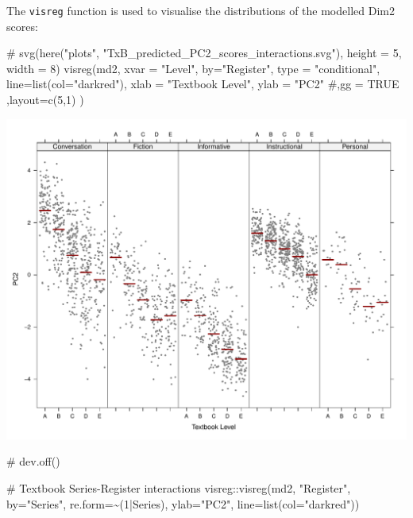 \documentclass[
  letterpaper,
  DIV=11,
  numbers=noendperiod]{scrreprt}
\newenvironment{Shaded}{\begin{snugshade}}{\end{snugshade}}
\newcommand{\AttributeTok}[1]{\textcolor[rgb]{0.40,0.45,0.13}{#1}}
\newcommand{\CommentTok}[1]{\textcolor[rgb]{0.37,0.37,0.37}{#1}}
\newcommand{\DecValTok}[1]{\textcolor[rgb]{0.68,0.00,0.00}{#1}}
\newcommand{\FunctionTok}[1]{\textcolor[rgb]{0.28,0.35,0.67}{#1}}
\newcommand{\NormalTok}[1]{\textcolor[rgb]{0.00,0.23,0.31}{#1}}
\newcommand{\SpecialCharTok}[1]{\textcolor[rgb]{0.37,0.37,0.37}{#1}}
\newcommand{\StringTok}[1]{\textcolor[rgb]{0.13,0.47,0.30}{#1}}
\begin{document}
The \texttt{visreg} function is used to visualise the distributions of
the modelled Dim2 scores:

\begin{Shaded}
\begin{Highlighting}[]
\CommentTok{\# svg(here("plots", "TxB\_predicted\_PC2\_scores\_interactions.svg"), height = 5, width = 8)}
\FunctionTok{visreg}\NormalTok{(md2, }\AttributeTok{xvar =} \StringTok{"Level"}\NormalTok{, }\AttributeTok{by=}\StringTok{"Register"}\NormalTok{, }\AttributeTok{type =} \StringTok{"conditional"}\NormalTok{,}
       \AttributeTok{line=}\FunctionTok{list}\NormalTok{(}\AttributeTok{col=}\StringTok{"darkred"}\NormalTok{), }
       \AttributeTok{xlab =} \StringTok{"Textbook Level"}\NormalTok{, }\AttributeTok{ylab =} \StringTok{"PC2"}
       \CommentTok{\#,gg = TRUE}
\NormalTok{       ,}\AttributeTok{layout=}\FunctionTok{c}\NormalTok{(}\DecValTok{5}\NormalTok{,}\DecValTok{1}\NormalTok{)}
\NormalTok{)}
\end{Highlighting}
\end{Shaded}

\includegraphics{E_Ch6_Analysis_files/figure-pdf/Dim2estimateplots-1.pdf}

\begin{Shaded}
\begin{Highlighting}[]
\CommentTok{\# dev.off()}

\CommentTok{\# Textbook Series{-}Register interactions}
\NormalTok{visreg}\SpecialCharTok{::}\FunctionTok{visreg}\NormalTok{(md2, }\StringTok{"Register"}\NormalTok{, }\AttributeTok{by=}\StringTok{"Series"}\NormalTok{, }\AttributeTok{re.form=}\SpecialCharTok{\textasciitilde{}}\NormalTok{(}\DecValTok{1}\SpecialCharTok{|}\NormalTok{Series),}
               \AttributeTok{ylab=}\StringTok{"PC2"}\NormalTok{, }\AttributeTok{line=}\FunctionTok{list}\NormalTok{(}\AttributeTok{col=}\StringTok{"darkred"}\NormalTok{))}
\end{Highlighting}
\end{Shaded}
\end{document}
